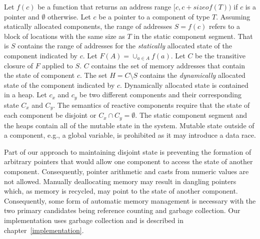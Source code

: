 Let $f(c)$ be a function that returns an address range $[c,c+sizeof(T))$ if $c$ is a pointer and $\emptyset$ otherwise.
Let $c$ be a pointer to a component of type $T$.
Assuming statically allocated components, the range of addresses $S = f(c)$ refers to a block of locations with the same size as $T$ in the static component segment.
That is $S$ contains the range of addresses for the \emph{statically} allocated state of the component indicated by $c$.
Let $F(A) = \cup_{a \in A} f(a)$.
Let $C$ be the transitive closure of $F$ applied to $S$.
$C$ contains the set of memory addresses that contain the state of component $c$.
The set $H = C \setminus S$ contains the \emph{dynamically} allocated state of the component indicated by $c$.
Dynamically allocated state is contained in a heap.
Let $c_x$ and $c_y$ be two different components and their corresponding state $C_x$ and $C_y$.
The semantics of reactive components require that the state of each component be disjoint or $C_x \cap C_y = \emptyset$.
The static component segment and the heaps contain all of the mutable state in the system.
Mutable state outside of a component, e.g., a global variable, is prohibited as it may introduce a data race.

Part of our approach to maintaining disjoint state is preventing the formation of arbitrary pointers that would allow one component to access the state of another component.
Consequently, pointer arithmetic and casts from numeric values are not allowed.
Manually deallocating memory may result in dangling pointers which, as memory is recycled, may point to the state of another component.
Consequently, some form of automatic memory management is necessary with the two primary candidates being reference counting and garbage collection.
Our implementation uses garbage collection and is described in chapter~\ref{implementation}.



